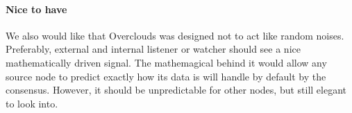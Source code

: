 \paragraph{Nice to have} We also would like that Overclouds was designed not to act like random noises. Preferably, external and internal listener or watcher should see a nice mathematically driven signal. The mathemagical behind it would allow any source node to predict exactly how its data is will handle by default by the consensus. However, it should be unpredictable for other nodes, but still elegant to look into.

